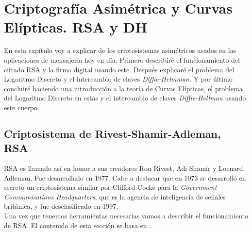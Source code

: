 \chapter{Criptografía Asimétrica y Curvas Elípticas. RSA y DH}
En esta capítulo voy a explicar de los criptosistemas asimétricos usados en las aplicaciones de mensajería hoy en día. Primero describiré el funcionamiento del cifrado RSA y la firma digital usando este. Después explicaré el problema del Logaritmo Discreto y el intercambio de claves \emph{Diffie-Helmman}. Y por último concluiré haciendo una introducción a la teoría de Curvas Elípticas, el problema del Logaritmo Discreto en estas y el intercambio de claves \emph{Diffie-Hellman} usando este cuerpo.\\

\section{Criptosistema de Rivest-Shamir-Adleman, RSA}
RSA es llamado así en honor a sus creadores Ron Rivest, Adi Shamir y Loenard Adleman. Fue desarrollado en 1977. Cabe a destacar que en 1973 se desarrolló en secreto un criptosistema similar por Clifford Cocks para la \emph{Government Communications Headquarters}, que es la agencia de inteligencia de señales británica, y fue desclasificado en 1997\cite{cliffordCocks}.\\
Una vez que tenemos herramientas necesarias vamos a describir el funcionamiento de RSA. El contenido de esta sección se basa en \cite{angelRiosMateos}.\\

